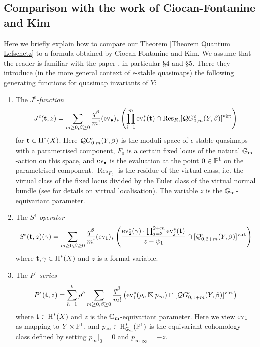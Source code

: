 \subsection{Comparison with the work of Ciocan-Fontanine and Kim}
Here we briefly explain how to compare our Theorem \ref{Theorem Quantum Lefschetz} to a formula obtained by Ciocan-Fontanine and Kim. We assume that the reader is familiar with the paper \cite{CF-K-wallcrossing}, in particular \S4 and \S5. There they introduce (in the more general context of $\epsilon$-stable quasimaps) the following generating functions for quasimap invariants of $Y$:
\begin{enumerate}
\item The \emph{$J^{\epsilon}$-function}
\begin{equation*} J^\epsilon({\bf t}, z)=\sum_{m\geq 0,\beta\geq 0} \dfrac{q^\beta}{m!} (\operatorname{ev}_\bullet)_*\left( \prod_{i=1}^m \operatorname{ev}_i^*({\bf t}) \cap\operatorname{Res}_{F_0} [\mathcal{Q}G^{\epsilon}_{0,m}(Y,\beta)]^{\operatorname{virt}} \right) \end{equation*}
for $\mathbf{t} \in \operatorname{H}^*(X)$. Here $\mathcal{Q}G^{\epsilon}_{0,m}(Y,\beta)$ is the moduli space of $\epsilon$-stable  quasimaps with a parametrised component, $F_0$ is a certain fixed locus of the natural $\mathbb{G}_{\text{m}}$-action on this space, and $\operatorname{ev}_\bullet$ is the evaluation at the point $0 \in \mathbb P^1$ on the parametrised component. $\operatorname{Res}_{F_0}$ is the residue of the virtual class, i.e. the virtual class of the fixed locus divided by the Euler class of the virtual normal bundle (see \cite{GraberPandharipande} for details on virtual localisation). The variable $z$ is the $\mathbb{G}_{\text{m}}$-equivariant parameter.
\item The \emph{$S^\epsilon$-operator}
\begin{equation*}
 S^\epsilon(\mathbf{t},z)(\gamma)=\sum_{m\ge 0,\beta\ge 0}\frac{q^\beta}{m!} 
(\operatorname{ev}_1)_*\left( \dfrac{\operatorname{ev}_2^*(\gamma) \cdot \prod_{j=3}^{2+m} \operatorname{ev}_j^*({\bf t})}{z-\psi_1} \cap[\mathcal{Q}^{\epsilon}_{0,2+m}(Y,\beta)]^{\operatorname{virt}} \right)
\end{equation*}
where $\mathbf{t}, \gamma \in \operatorname{H}^*(X)$ and $z$ is a formal variable.
\item The \emph{$P^\epsilon$-series}
\begin{equation*}
 P^\epsilon({\bf t}, z)=\sum_{h=1}^k \rho^h \sum_{m\geq 0,\beta\geq 0} \frac{q^\beta }{m!} \left( \operatorname{ev}_1^*(\rho_h \boxtimes p_\infty) \cap [\mathcal{Q}G^{\epsilon}_{0,1+m}(Y,\beta)]^{\operatorname{virt}} \right) \end{equation*}
where $\mathbf{t} \in \operatorname{H}^*(X)$ and $z$ is the $\mathbb{G}_{\text{m}}$-equivariant parameter. Here we view $\operatorname{ev}_1$ as mapping to $Y \times \mathbb P^1$, and $p_\infty\in \operatorname{H}^*_{\mathbb{G}_{\text{m}}}(\mathbb P^1)$ is the equivariant cohomology class defined by setting $p_{\infty}|_0 =0$ and $p_{\infty}|_{\infty}=-z$.
\end{enumerate}
